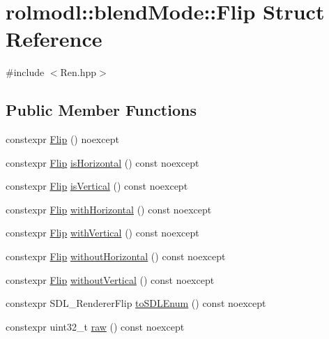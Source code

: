 \hypertarget{structrolmodl_1_1blend_mode_1_1_flip}{}\section{rolmodl\+::blend\+Mode\+::Flip Struct Reference}
\label{structrolmodl_1_1blend_mode_1_1_flip}


{\ttfamily \#include $<$Ren.\+hpp$>$}

\subsection*{Public Member Functions}
\begin{DoxyCompactItemize}
\item 
constexpr \mbox{\hyperlink{structrolmodl_1_1blend_mode_1_1_flip_a5a509838584014ec45436e2ce79b9c6f}{Flip}} () noexcept
\item 
constexpr \mbox{\hyperlink{structrolmodl_1_1blend_mode_1_1_flip}{Flip}} \mbox{\hyperlink{structrolmodl_1_1blend_mode_1_1_flip_a13ce5ea7245c1031865ffb2a39e9eb93}{is\+Horizontal}} () const noexcept
\item 
constexpr \mbox{\hyperlink{structrolmodl_1_1blend_mode_1_1_flip}{Flip}} \mbox{\hyperlink{structrolmodl_1_1blend_mode_1_1_flip_a3099539fd2201be20e84f278434712c7}{is\+Vertical}} () const noexcept
\item 
constexpr \mbox{\hyperlink{structrolmodl_1_1blend_mode_1_1_flip}{Flip}} \mbox{\hyperlink{structrolmodl_1_1blend_mode_1_1_flip_a756eefb0c738524c69dda814f9e1491a}{with\+Horizontal}} () const noexcept
\item 
constexpr \mbox{\hyperlink{structrolmodl_1_1blend_mode_1_1_flip}{Flip}} \mbox{\hyperlink{structrolmodl_1_1blend_mode_1_1_flip_a77b30724efcc5b5608c63039ddc02c1d}{with\+Vertical}} () const noexcept
\item 
constexpr \mbox{\hyperlink{structrolmodl_1_1blend_mode_1_1_flip}{Flip}} \mbox{\hyperlink{structrolmodl_1_1blend_mode_1_1_flip_a666867e1e97ad821c8b0163f6439c1ed}{without\+Horizontal}} () const noexcept
\item 
constexpr \mbox{\hyperlink{structrolmodl_1_1blend_mode_1_1_flip}{Flip}} \mbox{\hyperlink{structrolmodl_1_1blend_mode_1_1_flip_ab6bc247acea83f8d790f8620405bb602}{without\+Vertical}} () const noexcept
\item 
constexpr S\+D\+L\+\_\+\+Renderer\+Flip \mbox{\hyperlink{structrolmodl_1_1blend_mode_1_1_flip_a374ff0a2b050ad820246e0562472af1a}{to\+S\+D\+L\+Enum}} () const noexcept
\item 
constexpr uint32\+\_\+t \mbox{\hyperlink{structrolmodl_1_1blend_mode_1_1_flip_a8f06eaac85840203de5837dc5c4023f8}{raw}} () const noexcept
\end{DoxyCompactItemize}


